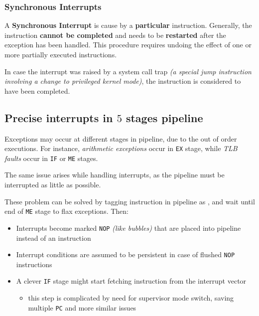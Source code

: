 \documentclass[english]{article}
\begin{document}
\subsubsection{Synchronous Interrupts}

A \textbf{Synchronous Interrupt} is cause by a \textbf{particular} instruction.
Generally, the instruction \textbf{cannot be completed} and needs to be \textbf{restarted} after the exception has been handled.
This procedure requires undoing the effect of one or more partially executed instructions.

In case the interrupt was raised by a system call trap \textit{(a special jump instruction involving a change to privileged kernel mode)}, the instruction is considered to have been completed.

\subsection[Precise interrupts in 5 stages pipeline]{Precise interrupts in \(5\) stages pipeline}

Exceptions may occur at different stages in pipeline, due to the out of order executions.
For instance, \textit{arithmetic exceptions} occur in \texttt{EX} stage, while \textit{TLB faults} occur in \texttt{IF} or \texttt{ME} stages.

The same issue arises while handling interrupts, as the pipeline must be interrupted as little as possible.

These problem can be solved by tagging instruction in pipeline as , and wait until end of \texttt{ME} stage to flax exceptions.
Then:

\begin{itemize}
  \item Interrupts become marked \texttt{NOP} \textit{(like bubbles)} that are placed into pipeline instead of an instruction
  \item Interrupt conditions are assumed to be persistent in case of flushed \texttt{NOP} instructions
  \item A clever \texttt{IF} stage might start fetching instruction from the interrupt vector
        \begin{itemize}
          \item this step is complicated by need for supervisor mode switch, saving multiple \texttt{PC} and more similar issues
        \end{itemize}
\end{itemize}
\end{document}
